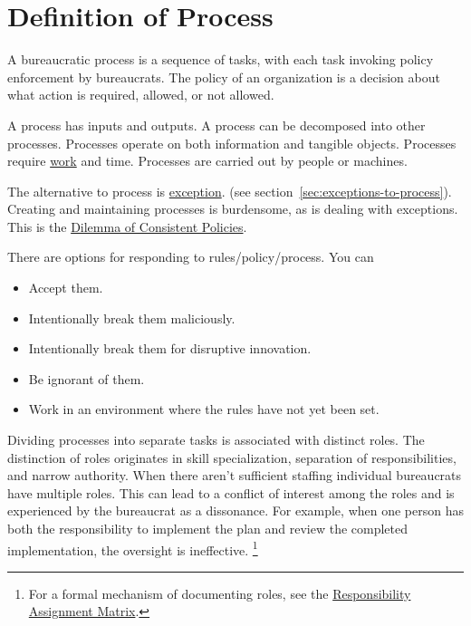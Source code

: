 \section{Definition of Process\label{sec:definition-of-process}}

A bureaucratic \gls{process} is a sequence of tasks, with each task invoking policy enforcement by bureaucrats. 
The policy of an organization is a decision about what action is required, allowed, or not allowed.


A process has inputs and outputs. 
A process can be decomposed into other processes. 
Processes operate on both information and tangible objects. 
Processes require \href{https://en.wikipedia.org/wiki/Work_(physics)}{work} and time. 
Processes are carried out by people or machines.


The alternative to process is \hyperref[sec:exceptions-to-process]{exception}. 
\ifsectionref
(see section~\ref{sec:exceptions-to-process}). 
\fi
Creating and maintaining processes is burdensome, as is dealing with exceptions. This is the \hyperref[table:policy-consistency-across-cases]{Dilemma of Consistent Policies}.


There are options for responding to rules/policy/process. You can
\begin{itemize}
    \item Accept them.
    \item Intentionally break them maliciously.
    \item Intentionally break them for disruptive innovation.
    \item Be ignorant of them.
    \item Work in an environment where the rules have not yet been set.
\end{itemize}

Dividing processes into separate tasks is associated with distinct roles. The distinction of roles originates in skill specialization, separation of responsibilities, and narrow authority. 
When there aren't sufficient staffing individual bureaucrats have multiple roles. This can lead to a conflict of interest among the roles and is experienced by the bureaucrat as a dissonance. For example, when one person has both the responsibility to implement the plan and review the completed implementation, the oversight is ineffective. \footnote{For a formal mechanism of documenting roles, see the 
\href{https://en.wikipedia.org/wiki/Responsibility_assignment_matrix}{Responsibility Assignment Matrix}.
}



